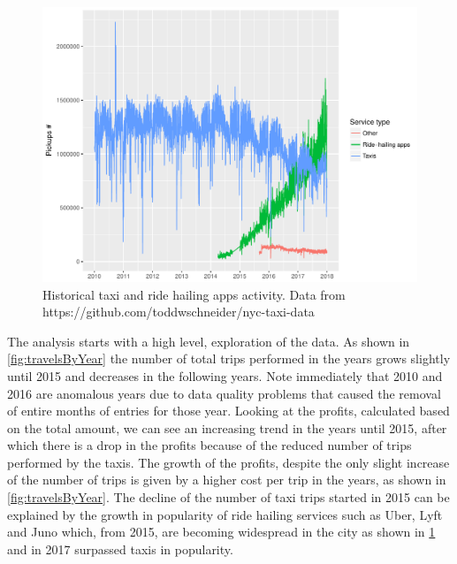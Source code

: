 \documentclass{acm_proc_article-sp-sigmod09}
\begin{document}
\begin{figure}
	\centering
	\includegraphics[width=1\columnwidth]{resources/fhv_vs_taxi.pdf}
	\caption{Historical taxi and ride hailing apps activity. Data from https://github.com/toddwschneider/nyc-taxi-data}
	\label{fig:uberVsTaxis}
\end{figure}

The analysis starts with a high level, exploration of the data. As shown in \cref{fig:travelsByYear} the number of total trips performed in the years grows slightly until 2015 and decreases in the following years. Note immediately that 2010 and 2016 are anomalous years due to data quality problems that caused the removal of entire months of entries for those year. Looking at the profits, calculated based on the total amount, we can see an increasing trend in the years until 2015, after which there is a drop in the profits because of the reduced number of trips performed by the taxis. The growth of the profits, despite the only slight increase of the number of trips is given by a higher cost per trip in the years, as shown in \cref{fig:travelsByYear}. The decline of the number of taxi trips started in 2015 can be explained by the growth in popularity of ride hailing services such as Uber, Lyft and Juno which, from 2015, are becoming widespread in the city as shown in \cref{fig:uberVsTaxis} and in 2017 surpassed taxis in popularity.
\end{document}
